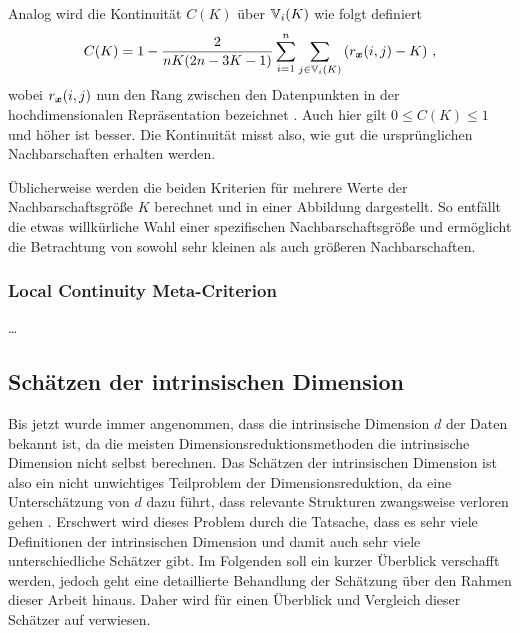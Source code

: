 Analog wird die Kontinuität $C(K)$ über $\mathbb{V}_i(K)$ wie folgt definiert
\begin{equation}
	C(K) = 1 - \frac{2}{nK(2n - 3K - 1)} \sum_{i = 1}^{n}\sum_{j \in \mathbb{V}_i(K) } \left( r_{\bm{x}}(i, j) - K \right) \, ,
\end{equation}
wobei $r_{\bm{x}}(i, j)$ nun den Rang zwischen den Datenpunkten in der hochdimensionalen Repräsentation bezeichnet \parencite[487]{Venna.2001}. Auch hier gilt $0 \leq C(K) \leq 1$ und höher ist besser. Die Kontinuität
misst also, wie gut die ursprünglichen Nachbarschaften erhalten werden.

Üblicherweise werden die beiden Kriterien für mehrere Werte der Nachbarschaftsgröße $K$ berechnet und in einer Abbildung dargestellt. So entfällt die etwas willkürliche Wahl einer spezifischen Nachbarschaftsgröße und ermöglicht die Betrachtung von sowohl sehr kleinen als auch größeren Nachbarschaften.

\subsubsection{Local Continuity Meta-Criterion}
\label{ch:Vergleich:sec:Methodik:subsec:Qualitaetskriterien:LCMC}
\ldots
\subsection{Schätzen der intrinsischen Dimension}
\label{ch:Vergleich:sec:Methodik:subsec:SchaetzenDerIntrinsischenDim}

Bis jetzt wurde immer angenommen, dass die intrinsische Dimension $d$ der Daten bekannt ist, da die
meisten Dimensionsreduktionsmethoden die intrinsische Dimension nicht selbst berechnen. Das
Schätzen der intrinsischen Dimension ist also ein nicht unwichtiges Teilproblem der
Dimensionsreduktion, da eine Unterschätzung von $d$ dazu führt, dass relevante Strukturen
zwangsweise verloren gehen \parencite[1]{Levina.2004}. Erschwert wird dieses Problem durch die Tatsache, dass es sehr viele
Definitionen der intrinsischen Dimension und damit auch sehr viele unterschiedliche Schätzer gibt.
Im Folgenden soll ein kurzer Überblick verschafft werden, jedoch geht eine detaillierte Behandlung
der Schätzung über den Rahmen dieser Arbeit hinaus. Daher wird für einen Überblick und Vergleich
dieser Schätzer auf \textcites{Campadelli.2015}{Bac.2021}{Verveer.1995} verwiesen.

